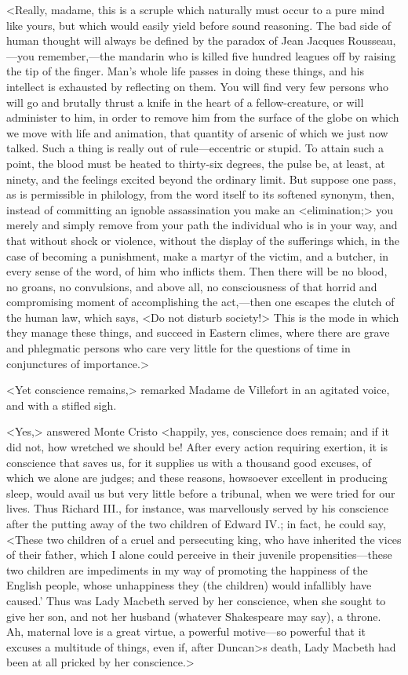  <Really, madame, this is a scruple which naturally must occur to a pure mind like yours, but which would easily yield before sound reasoning. The bad side of human thought will always be defined by the paradox of Jean Jacques Rousseau,—you remember,—the mandarin who is killed five hundred leagues off by raising the tip of the finger. Man's whole life passes in doing these things, and his intellect is exhausted by reflecting on them. You will find very few persons who will go and brutally thrust a knife in the heart of a fellow-creature, or will administer to him, in order to remove him from the surface of the globe on which we move with life and animation, that quantity of arsenic of which we just now talked. Such a thing is really out of rule—eccentric or stupid. To attain such a point, the blood must be heated to thirty-six degrees, the pulse be, at least, at ninety, and the feelings excited beyond the ordinary limit. But suppose one pass, as is permissible in philology, from the word itself to its softened synonym, then, instead of committing an ignoble assassination you make an <elimination;> you merely and simply remove from your path the individual who is in your way, and that without shock or violence, without the display of the sufferings which, in the case of becoming a punishment, make a martyr of the victim, and a butcher, in every sense of the word, of him who inflicts them. Then there will be no blood, no groans, no convulsions, and above all, no consciousness of that horrid and compromising moment of accomplishing the act,—then one escapes the clutch of the human law, which says, <Do not disturb society!> This is the mode in which they manage these things, and succeed in Eastern climes, where there are grave and phlegmatic persons who care very little for the questions of time in conjunctures of importance.> 

 <Yet conscience remains,> remarked Madame de Villefort in an agitated voice, and with a stifled sigh. 

 <Yes,> answered Monte Cristo <happily, yes, conscience does remain; and if it did not, how wretched we should be! After every action requiring exertion, it is conscience that saves us, for it supplies us with a thousand good excuses, of which we alone are judges; and these reasons, howsoever excellent in producing sleep, would avail us but very little before a tribunal, when we were tried for our lives. Thus Richard III., for instance, was marvellously served by his conscience after the putting away of the two children of Edward IV.; in fact, he could say, <These two children of a cruel and persecuting king, who have inherited the vices of their father, which I alone could perceive in their juvenile propensities—these two children are impediments in my way of promoting the happiness of the English people, whose unhappiness they (the children) would infallibly have caused.' Thus was Lady Macbeth served by her conscience, when she sought to give her son, and not her husband (whatever Shakespeare may say), a throne. Ah, maternal love is a great virtue, a powerful motive—so powerful that it excuses a multitude of things, even if, after Duncan>s death, Lady Macbeth had been at all pricked by her conscience.> 

